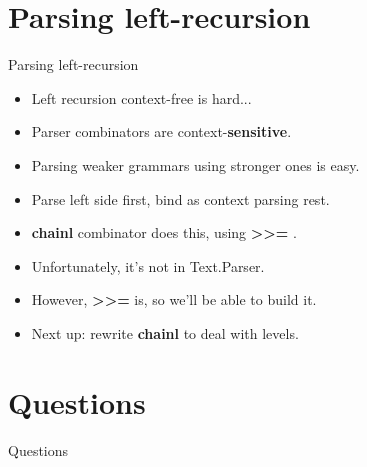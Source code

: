 \documentclass
  [ department=icis
  , notes={show notes}
  , slidesperpage=1
  , nohandout
  , official=true
  ] {beamerruhuisstijl}
\newcommand{\IdrisFunction}[1]{\textbf{\textcolor[RGB]{30,150,10}{#1}}}
\newcommand{\frameAndSection}[1]{\section{#1}\begin{frame}{#1}}
\begin{document}
\frameAndSection{Parsing left-recursion}
\onslide<+->
\begin{itemize}
    \onslide<+->\item Left recursion context-free is hard...
    \onslide<+->\item Parser combinators are context-\textbf{sensitive}.
    \onslide<+->\item Parsing weaker grammars using stronger ones is easy.
    \onslide<+->\item Parse left side first, bind as context parsing rest.
    \onslide<+->\item \IdrisFunction{chainl} combinator does this, using
        \IdrisFunction{>>=} . 
    \onslide<+->\item Unfortunately, it's not in Text.Parser.
    \onslide<+->\item However, \IdrisFunction{>>=} is, so we'll be able to build
        it.
    \onslide<+->\item Next up: rewrite \IdrisFunction{chainl} to deal with
        levels.
\end{itemize}
\end{frame}

\frameAndSection{Questions}
\onslide<+->
\end{frame}
\end{document}
